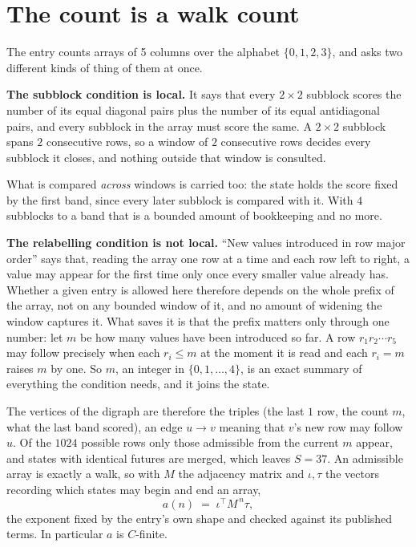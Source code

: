 \documentclass[11pt,a4paper]{article}
\theoremstyle{plain}
\theoremstyle{definition}
\begin{document}
\section{The count is a walk count}

The entry counts arrays of 5 columns over the alphabet $\{0,1,2,3\}$, and asks two different kinds of thing of them at once.

\textbf{The subblock condition is local.} It says that every $2\times2$ subblock scores the number of its equal diagonal pairs plus the number of its equal antidiagonal pairs, and every subblock in the array must score the same. A $ 2\times2$ subblock spans $2$ consecutive rows, so a window of $2$ consecutive rows decides every subblock it closes, and nothing outside that window is consulted.

What is compared \emph{across} windows is carried too: the state holds the score fixed by the first band, since every later subblock is compared with it. With $4$ subblocks to a band that is a bounded amount of bookkeeping and no more.

\textbf{The relabelling condition is not local.} ``New values introduced in row major order'' says that, reading the array one row at a time and each row left to right, a value may appear for the first time only once every smaller value already has. Whether a given entry is allowed here therefore depends on the whole prefix of the array, not on any bounded window of it, and no amount of widening the window captures it. What saves it is that the prefix matters only through one number: let $m$ be how many values have been introduced so far. A row $r_1r_2\cdots r_5$ may follow precisely when each $r_i\le m$ at the moment it is read and each $r_i=m$ raises $m$ by one. So $m$, an integer in $\{0,1,\dots,4\}$, is an exact summary of everything the condition needs, and it joins the state.

The vertices of the digraph are therefore the triples (the last $1$ row, the count $m$, what the last band scored), an edge $u\to v$ meaning that $v$'s new row may follow $u$. Of the $1024$ possible rows only those admissible from the current $m$ appear, and states with identical futures are merged, which leaves $S=37$. An admissible array is exactly a walk, so with $M$ the adjacency matrix and $\iota,\tau$ the vectors recording which states may begin and end an array,
\[
a(n)\;=\;\iota^{\!\top}M^{\,n}\tau ,
\]
the exponent fixed by the entry's own shape and checked against its published terms. In
particular $a$ is $C$-finite.
\end{document}
